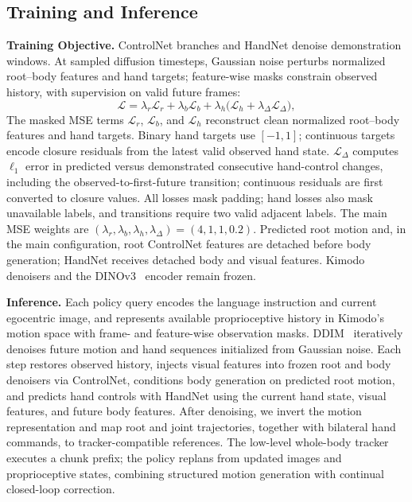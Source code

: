 \subsection{Training and Inference}
\label{sec:training_inference}

\textbf{Training Objective.} ControlNet branches and HandNet denoise demonstration windows. At sampled diffusion timesteps, Gaussian noise perturbs normalized root--body features and hand targets; feature-wise masks constrain observed history, with supervision on valid future frames:
\begin{equation}
  \mathcal{L}=\lambda_r\mathcal{L}_{r}+\lambda_b\mathcal{L}_{b}
  +\lambda_h\bigl(\mathcal{L}_{h}+\lambda_{\Delta}\mathcal{L}_{\Delta}\bigr),
  \label{eq:policy_training_objective}
\end{equation}
The masked MSE terms $\mathcal{L}_{r}$, $\mathcal{L}_{b}$, and $\mathcal{L}_{h}$ reconstruct clean normalized root--body features and hand targets. Binary hand targets use $[-1,1]$; continuous targets encode closure residuals from the latest valid observed hand state. $\mathcal{L}_{\Delta}$ computes $\ell_1$ error in predicted versus demonstrated consecutive hand-control changes, including the observed-to-first-future transition; continuous residuals are first converted to closure values. All losses mask padding; hand losses also mask unavailable labels, and transitions require two valid adjacent labels. The main MSE weights are $(\lambda_r,\lambda_b,\lambda_h,\lambda_{\Delta})=(4,1,1,0.2)$. Predicted root motion and, in the main configuration, root ControlNet features are detached before body generation; HandNet receives detached body and visual features. Kimodo denoisers and the DINOv3~\cite{dinov3} encoder remain frozen.

\textbf{Inference.} Each policy query encodes the language instruction and current egocentric image, and represents available proprioceptive history in Kimodo's motion space with frame- and feature-wise observation masks. DDIM~\cite{song2022denoisingdiffusionimplicitmodels} iteratively denoises future motion and hand sequences initialized from Gaussian noise. Each step restores observed history, injects visual features into frozen root and body denoisers via ControlNet, conditions body generation on predicted root motion, and predicts hand controls with HandNet using the current hand state, visual features, and future body features. After denoising, we invert the motion representation and map root and joint trajectories, together with bilateral hand commands, to tracker-compatible references. The low-level whole-body tracker executes a chunk prefix; the policy replans from updated images and proprioceptive states, combining structured motion generation with continual closed-loop correction.
